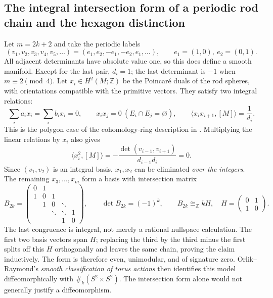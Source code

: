 \documentclass[a4paper,11pt]{article}
\numberwithin{equation}{section}
\theoremstyle{definition}
\newcommand{\Z}{\mathbb Z}
\begin{document}
\subsection{The integral intersection form of a periodic rod chain and the hexagon distinction}
Let $m=2k+2$ and take the periodic labels
\begin{equation}\label{eq:toric-periodic-labels}
 (v_1,v_2,v_3,v_4,v_5,\ldots)
 =(e_1,e_2,-e_1,-e_2,e_1,\ldots),\qquad
 e_1=(1,0),\ e_2=(0,1).
\end{equation}
All adjacent determinants have absolute value one, so this does define a smooth manifold.
Except for the last pair, $d_i=1$; the last determinant is $-1$ when $m\equiv2\pmod4$.
Let $x_i\in H^2(M;\Z)$ be the Poincar\'e duals of the rod spheres, with orientations compatible with the primitive vectors.
They satisfy two integral relations:
\begin{equation}\label{eq:toric-divisor-relations}
 \sum_i a_i x_i=\sum_i b_i x_i=0,\qquad
 x_ix_j=0\ (E_i\cap E_j=\varnothing),\qquad
 \langle x_ix_{i+1},[M]\rangle=\frac1{d_i}.
\end{equation}
This is the polygon case of the cohomology-ring description in \cite[Theorem 4.14]{DJ1991}.
Multiplying the linear relations by $x_i$ also gives
\[
 \langle x_i^2,[M]\rangle
 =-\frac{\det(v_{i-1},v_{i+1})}{d_{i-1}d_i}=0.
\]
Since $(v_1,v_2)$ is an integral basis, $x_1,x_2$ can be eliminated \emph{over the integers}.
The remaining $x_3,\ldots,x_m$ form a basis with intersection matrix
\begin{equation}\label{eq:toric-integral-chain}
 B_{2k}=\begin{pmatrix}
 0&1&&&\\1&0&1&&\\&1&0&\ddots&\\&&\ddots&\ddots&1\\&&&1&0
 \end{pmatrix},\qquad
 \det B_{2k}=(-1)^k,\qquad B_{2k}\cong_\Z kH,\quad
 H=\begin{pmatrix}0&1\\1&0\end{pmatrix}.
\end{equation}
The last congruence is integral, not merely a rational nullspace calculation.
The first two basis vectors span $H$; replacing the third by the third minus the first splits off this $H$ orthogonally and leaves the same chain, proving the claim inductively.
The form is therefore even, unimodular, and of signature zero.
Orlik--Raymond's \emph{smooth classification of torus actions} \cite[\S5]{OrlikRaymond} then identifies this model diffeomorphically with $\#_k(S^2\times S^2)$.
The intersection form alone would not generally justify a diffeomorphism.
\end{document}
